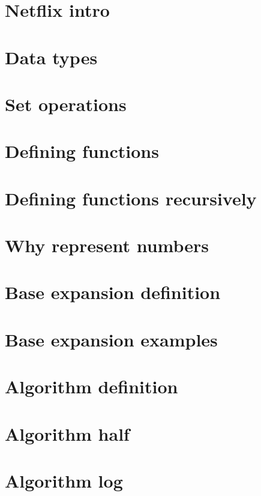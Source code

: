
\section*{Netflix intro}

\vfill
\section*{Data types}

\vfill
\section*{Set operations}

\vfill
\section*{Defining functions}

\vfill
\section*{Defining functions recursively}

\vfill
\section*{Why represent numbers}

\vfill
\section*{Base expansion definition}

\vfill
\section*{Base expansion examples}

\vfill
\section*{Algorithm definition}

\vfill
\section*{Algorithm half}

\vfill
\section*{Algorithm log}

\vfill
